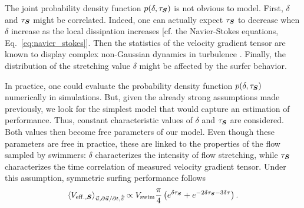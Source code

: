 The joint probability density function $p(\delta, \tau_{\boldsymbol{S}})$ is not obvious to model.
First, $\delta$ and $\tau_{\boldsymbol{S}}$ might be correlated.
Indeed, one can actually expect $\tau_{\boldsymbol{S}}$ to decrease when $\delta$ increase as the local dissipation increases [cf. the Navier-Stokes equations, Eq.~\eqref{eq:navier_stokes}].
Then the statistics of the velocity gradient tensor are known to display complex non-Gaussian dynamics in turbulence \citep{li2005origin}.
Finally, the distribution of the stretching value $\delta$ might be affected by the surfer behavior.

In practice, one could evaluate the probability density function $p(\delta, \tau_{\boldsymbol{S}})$ numerically in simulations.
But, given the already strong assumptions made previously, we look for the simplest model that would capture an estimation of performance.
Thus, constant characteristic values of $\delta$ and $\tau_{\boldsymbol{S}}$ are considered.
Both values then become free parameters of our model.
Even though these parameters are free in practice, these are linked to the properties of the flow sampled by swimmers:
$\delta$ characterizes the intensity of flow stretching, while $\tau_{\boldsymbol{S}}$ characterizes the time correlation of measured velocity gradient tensor.
Under this assumption, symmetric surfing performance follows
\begin{equation}\label{turb:eq:performance_estimation_sym}
	\left\langle V_{\mathrm{eff.}, \boldsymbol{S}} \right\rangle_{\vec{u}, \partial \vec{u} / \partial t, \hat{\vec{z}}} \propto V_{\mathrm{swim}} \frac{\pi}{4} \left( e^{\delta \tau_{\boldsymbol{S}}} + e^{-2 \delta \tau_{\boldsymbol{S}} - 3 \delta \tau} \right).
\end{equation}


